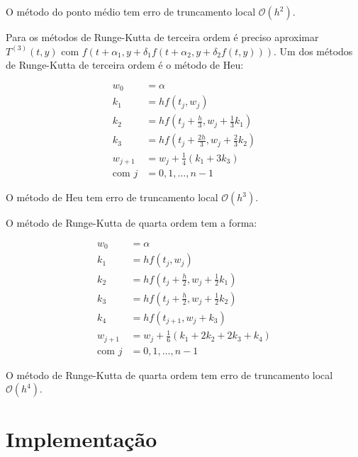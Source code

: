 \documentclass[final,5p]{elsarticle}
\numberwithin{equation}{section}
\begin{document}
        O método do ponto médio tem erro de truncamento local $\mathcal{O}(h^2)$.

        Para os métodos de Runge-Kutta de terceira ordem é preciso aproximar $T^{(3)}(t,y)$ com $f(t+\alpha_1,y+\delta_1f(t+\alpha_2,y+\delta_2f(t,y)))$. Um dos métodos de Runge-Kutta de terceira ordem é o método de Heu:

        \begin{align}
            w_0 &= \alpha \nonumber \\
            k_1 &= hf\left(t_j,w_j\right) \nonumber \\
            k_2 &= hf\left(t_j+\frac{h}{3},w_j+\frac{1}{3}k_1\right) \nonumber \\
            k_3 &= hf\left(t_j+\frac{2h}{3},w_j+\frac{2}{3}k_2\right) \nonumber \\
            w_{j+1} &= w_{j} + \frac{1}{4} (k_1 + 3 k_3) \label{eq:heu} \\
            \text{com } j&=0,1,\ldots,n-1 \nonumber
        \end{align}

        O método de Heu tem erro de truncamento local $\mathcal{O}(h^3)$.

        O método de Runge-Kutta de quarta ordem tem a forma:

        \begin{align}
            w_0 &= \alpha \nonumber \\
            k_1 &= hf\left(t_j,w_j\right) \nonumber \\
            k_2 &= hf\left(t_j+\frac{h}{2},w_j+\frac{1}{2}k_1\right) \nonumber \\
            k_3 &= hf\left(t_j+\frac{h}{2},w_j+\frac{1}{2}k_2\right) \nonumber \\
            k_4 &= hf\left(t_{j+1},w_j+k_3\right) \nonumber \\
            w_{j+1} &= w_{j} + \frac{1}{6} (k_1 + 2k_2 + 2k_3 + k_4) \label{eq:rk4} \\
            \text{com } j&=0,1,\ldots,n-1 \nonumber
        \end{align}

        O método de Runge-Kutta de quarta ordem tem erro de truncamento local $\mathcal{O}(h^4)$.

\section{Implementação} \label{sec:implementacao}
\end{document}
